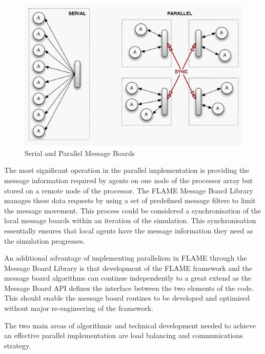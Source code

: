 \begin{figure}[h]
	\centering
		\includegraphics[scale=0.25]{flame.jpg}
	\caption{Serial and Parallel Message Boards}
	\label{fig:Figure2}
\end{figure}

The most significant operation in the parallel implementation is providing the message information required by agents on one node of the processor array but stored on a remote node of the processor. The FLAME Message Board Library manages these data requests by using a set of predefined message filters to limit the message movement. This process could be considered a synchronisation of the local message boards within an iteration of the simulation. This synchronisation essentially ensures that local agents have the message information they need as the simulation progresses.

An additional advantage of implementing parallelism in FLAME through the Message Board Library is that development of the FLAME framework and the message board algorithms can continue independently to a great extend as the Message Board API defines the interface between the two elements of the code. This should enable the message board routines to be developed and optimised without major re-engineering of the framework.

The two main areas of algorithmic and technical development needed to achieve an effective parallel implementation are load balancing and communications strategy. 

